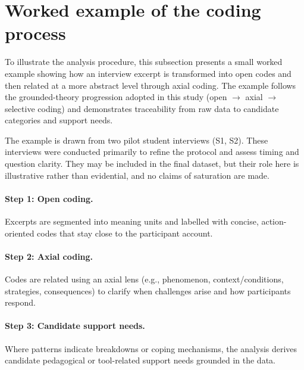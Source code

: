 \section{Worked example of the coding process}
\label{sec:method_coding_example}

To illustrate the analysis procedure, this subsection presents a small worked example showing how an interview excerpt is transformed into open codes and then related at a more abstract level through axial coding. The example follows the grounded-theory progression adopted in this study (open $\rightarrow$ axial $\rightarrow$ selective coding) and demonstrates traceability from raw data to candidate categories and support needs.

The example is drawn from two pilot student interviews (S1, S2). These interviews were conducted primarily to refine the protocol and assess timing and question clarity. They may be included in the final dataset, but their role here is illustrative rather than evidential, and no claims of saturation are made.

\paragraph{Step 1: Open coding.}
Excerpts are segmented into meaning units and labelled with concise, action-oriented codes that stay close to the participant account.

\paragraph{Step 2: Axial coding.}
Codes are related using an axial lens (e.g., phenomenon, context/conditions, strategies, consequences) to clarify when challenges arise and how participants respond.

\paragraph{Step 3: Candidate support needs.}
Where patterns indicate breakdowns or coping mechanisms, the analysis derives candidate pedagogical or tool-related support needs grounded in the data.

